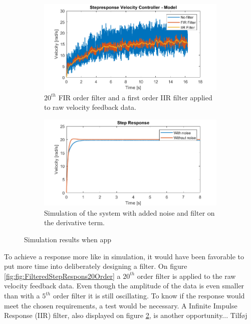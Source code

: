 \documentclass[../../main.tex]{subfiles}
\begin{document}
\begin{figure}[H]
     \centering
     \begin{subfigure}[b]{0.49\textwidth}
         \centering
    \includegraphics[width=\textwidth]{Sections/Miscellaneous/Images/FilteredStepRespons20Order.png}
    \caption{$20^{th}$ FIR order filter and a first order IIR filter applied to raw velocity feedback data.}
    \label{fig:FilteredStepRespons20Order}
     \end{subfigure}
     \hfill
     \begin{subfigure}[b]{0.49\textwidth}
         \centering
         \includegraphics[width=\textwidth]{Sections/Miscellaneous/Images/StepResponsNoiseAndFilter.png}
         \caption{Simulation of the system with added noise and filter on the derivative term.}
         \label{fig:StepResponsAddedNoiseAndFilter}
     \end{subfigure}
        \caption{Simulation results when app}
        \label{fig:FilterDiskussionImplementedFilter20}
\end{figure}
To achieve a response more like in simulation, it would have been favorable to put more time into deliberately designing a filter. On figure \ref{fig:fig:FilteredStepRespons20Order} a $20^{th}$ order filter is applied to the raw velocity feedback data. Even though the amplitude of the data is even smaller than with a $5^{th}$ order filter it is still oscillating. To know if the response would meet the chosen requirements, a test would be necessary. A Infinite Impulse Response (IIR) filter, also displayed on figure \ref{fig:StepResponsAddedNoiseAndFilter}, is another opportunity... Tilføj
\end{document}
